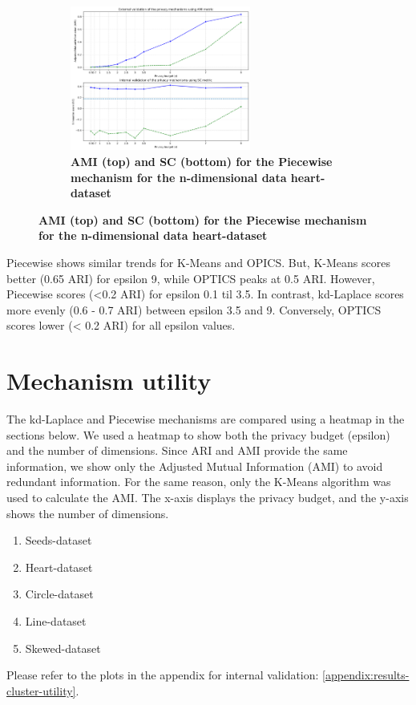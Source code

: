 \begin{figure}[H]
\begin{subfigure}{1\textwidth}
        \caption{\textbf{AMI (top) and SC (bottom) for the Piecewise mechanism for the n-dimensional data heart-dataset}}
        \centering
        \includegraphics[width=0.65\textwidth]{Results/kd-laplace/piecewise/heart-dataset/ami-and-sc_10_dimensions.png}
    \end{subfigure}
    \label{fig:validation-heart-dataset_comparison_nd-laplace}
\end{figure}

Piecewise shows similar trends for K-Means and OPICS. But, K-Means scores better (0.65 ARI) for epsilon 9, while OPTICS peaks at 0.5 ARI.
However, Piecewise scores (<0.2 ARI) for epsilon 0.1 til 3.5.
In contrast, kd-Laplace scores more evenly (0.6 - 0.7 ARI) between epsilon 3.5 and 9. Conversely, OPTICS scores lower (< 0.2 ARI) for all epsilon values.
\newpage
\section{Mechanism utility}
The kd-Laplace and Piecewise mechanisms are compared using a heatmap in the sections below.
We used a heatmap to show both the privacy budget (epsilon) and the number of dimensions.
Since ARI and AMI provide the same information, we show only the Adjusted Mutual Information (AMI) to avoid redundant information.
For the same reason, only the K-Means algorithm was used to calculate the AMI.
The x-axis displays the privacy budget, and the y-axis shows the number of dimensions.
\begin{enumerate}
    \item Seeds-dataset
    \item Heart-dataset
    \item Circle-dataset
    \item Line-dataset
    \item Skewed-dataset
\end{enumerate}
Please refer to the plots in the appendix for internal validation: \ref{appendix:results-cluster-utility}.
\newpage
